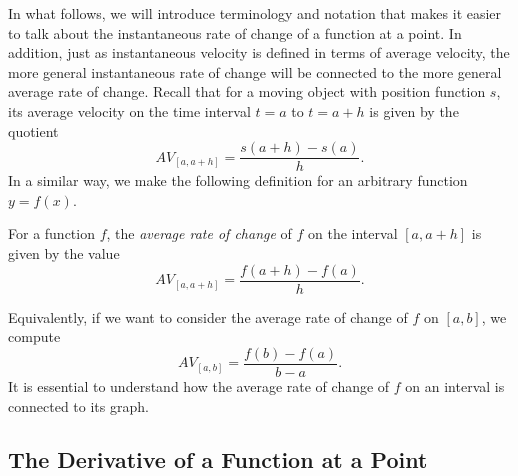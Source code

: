 In what follows, we will introduce terminology and notation that makes it easier to talk about the instantaneous rate of change of a function at a point.  In addition, just as instantaneous velocity is defined in terms of average velocity, the more general instantaneous rate of change will be connected to the more general average rate of change.  Recall that for a moving object with position function $s$, its average velocity on the time interval $t = a$ to $t = a+h$ is given by the quotient 
$$AV_{[a,a+h]} = \frac{s(a+h)-s(a)}{h}.$$
In a similar way, we make the following definition for an arbitrary function $y = f(x).$
\begin{definition}
For a function $f$, the \emph{average rate of change} of $f$ on the interval $[a,a+h]$ is given by the value
$$AV_{[a,a+h]} = \frac{f(a+h)-f(a)}{h}.$$
\end{definition}
\nin Equivalently, if we want to consider the average rate of change of $f$ on $[a,b]$, we compute 
$$AV_{[a,b]} = \frac{f(b)-f(a)}{b-a}.$$
It is essential to understand how the average rate of change of $f$ on an interval is connected to its graph.



\subsection*{The Derivative of a Function at a Point}

